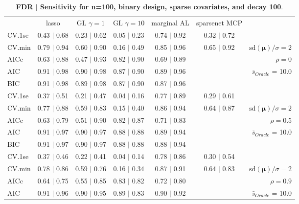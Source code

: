 \begin{table}\vspace{-.5cm}
\caption[l]{ {\it }
{ \bf FDR $\boldsymbol{\mid}$ Sensitivity for n=100, binary design, sparse covariates, and  decay  100}.}
\vspace{-.5cm}
\footnotesize{}
\begin{center}
\begin{tabular}{l*{5}{c}|r}
 & lasso & GL $\gamma=1$ & GL $\gamma=10$ & marginal AL & sparsenet MCP  & \\
 \cline{1-7}
CV.1se & 0.43 $\mid$ 0.68 & 0.23 $\mid$ 0.62 & 0.05 $\mid$ 0.23 & 0.74 $\mid$ 0.92 & 0.32 $\mid$ 0.72 & \\
CV.min & 0.79 $\mid$ 0.94 & 0.60 $\mid$ 0.90 & 0.16 $\mid$ 0.49 & 0.85 $\mid$ 0.96 & 0.65 $\mid$ 0.92 &  $\mathrm{sd}(\mathbf{\mu})/\sigma=2$ \\
AICc & 0.63 $\mid$ 0.88 & 0.47 $\mid$ 0.93 & 0.82 $\mid$ 0.90 & 0.69 $\mid$ 0.89 & & $\rho=0$ \\
AIC & 0.91 $\mid$ 0.98 & 0.90 $\mid$ 0.98 & 0.87 $\mid$ 0.90 & 0.89 $\mid$ 0.96 & &  \multirow{2}{*}{$\bar{s}_{Oracle}$ = 10.0} \\
BIC & 0.91 $\mid$ 0.98 & 0.89 $\mid$ 0.98 & 0.87 $\mid$ 0.90 & 0.87 $\mid$ 0.96 & &  \\
 \hline 
CV.1se & 0.37 $\mid$ 0.51 & 0.21 $\mid$ 0.47 & 0.04 $\mid$ 0.16 & 0.77 $\mid$ 0.89 & 0.29 $\mid$ 0.61 & \\
CV.min & 0.77 $\mid$ 0.88 & 0.59 $\mid$ 0.83 & 0.15 $\mid$ 0.40 & 0.86 $\mid$ 0.94 & 0.64 $\mid$ 0.87 &  $\mathrm{sd}(\mathbf{\mu})/\sigma=2$ \\
AICc & 0.63 $\mid$ 0.79 & 0.51 $\mid$ 0.90 & 0.82 $\mid$ 0.87 & 0.71 $\mid$ 0.83 & & $\rho=0.5$ \\
AIC & 0.91 $\mid$ 0.97 & 0.90 $\mid$ 0.97 & 0.88 $\mid$ 0.88 & 0.89 $\mid$ 0.94 & &  \multirow{2}{*}{$\bar{s}_{Oracle}$ = 10.0} \\
BIC & 0.91 $\mid$ 0.97 & 0.90 $\mid$ 0.97 & 0.88 $\mid$ 0.88 & 0.88 $\mid$ 0.94 & &  \\
 \hline 
CV.1se & 0.37 $\mid$ 0.46 & 0.22 $\mid$ 0.41 & 0.04 $\mid$ 0.14 & 0.78 $\mid$ 0.86 & 0.30 $\mid$ 0.54 & \\
CV.min & 0.78 $\mid$ 0.86 & 0.59 $\mid$ 0.76 & 0.16 $\mid$ 0.34 & 0.87 $\mid$ 0.91 & 0.64 $\mid$ 0.83 &  $\mathrm{sd}(\mathbf{\mu})/\sigma=2$ \\
AICc & 0.64 $\mid$ 0.75 & 0.55 $\mid$ 0.85 & 0.83 $\mid$ 0.82 & 0.72 $\mid$ 0.80 & & $\rho=0.9$ \\
AIC & 0.91 $\mid$ 0.96 & 0.90 $\mid$ 0.95 & 0.89 $\mid$ 0.83 & 0.90 $\mid$ 0.92 & &  \multirow{2}{*}{$\bar{s}_{Oracle}$ = 10.0} \\

\end{tabular}
\end{center}
\end{table}
